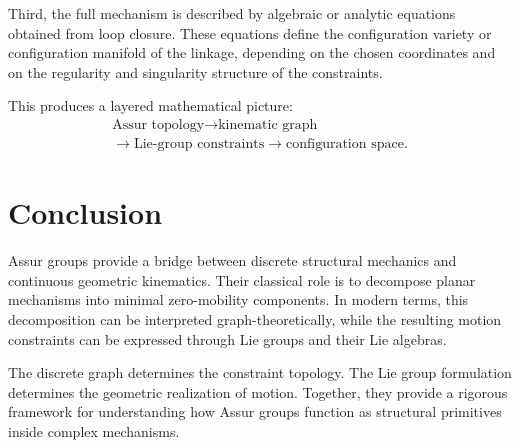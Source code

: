 \documentclass[12pt,a4paper]{article}
\begin{document}
Third, the full mechanism is described by algebraic or analytic equations obtained from loop closure. These equations define the configuration variety or configuration manifold of the linkage, depending on the chosen coordinates and on the regularity and singularity structure of the constraints.

This produces a layered mathematical picture:
\[
\begin{gathered}
\text{Assur topology}
\longrightarrow
\text{kinematic graph}\\
\longrightarrow
\text{Lie-group constraints}
\longrightarrow
\text{configuration space}.
\end{gathered}
\]

\section{Conclusion}

Assur groups provide a bridge between discrete structural mechanics and continuous geometric kinematics. Their classical role is to decompose planar mechanisms into minimal zero-mobility components. In modern terms, this decomposition can be interpreted graph-theoretically, while the resulting motion constraints can be expressed through Lie groups and their Lie algebras.

The discrete graph determines the constraint topology. The Lie group formulation determines the geometric realization of motion. Together, they provide a rigorous framework for understanding how Assur groups function as structural primitives inside complex mechanisms.
\end{document}
